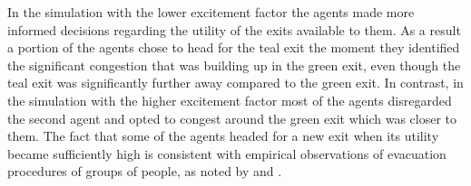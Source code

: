 In the simulation with the lower excitement factor the agents made more informed decisions regarding the utility of the exits available to them. As a result a portion of the agents chose to head for the teal exit the moment they identified the significant congestion that was building up in the green exit, even though the teal exit was significantly further away compared to the green exit. In contrast, in the simulation with the higher excitement factor most of the agents disregarded the second agent and opted to congest around the green exit which was closer to them. The fact that some of the agents headed for a new exit when its utility became sufficiently high is consistent with empirical observations of evacuation procedures of groups of people, as noted by \citet{Helbing1997} and \citet{Seneviratne1985}.
